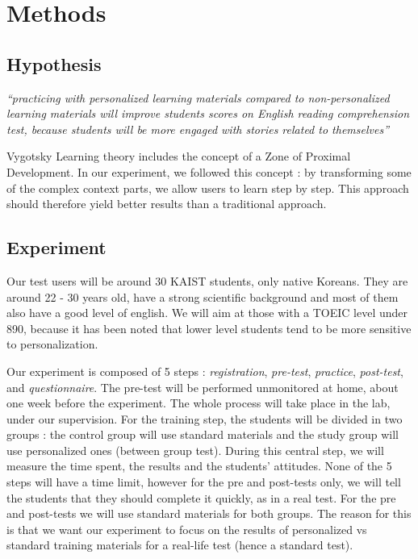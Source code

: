 \documentclass[a4paper,12pt]{article}
\begin{document}
\section{Methods}

\subsection{Hypothesis}

\textit{``practicing with personalized learning materials compared to non-personalized learning materials will improve students scores on English reading comprehension test, because students will be more engaged with stories related to themselves''}

Vygotsky Learning theory includes the concept of a Zone of Proximal Development. In our experiment, we followed this concept : by transforming some of the complex context parts, we allow users to learn step by step. This approach should therefore yield better results than a traditional approach.

\subsection{Experiment}

Our test users will be around 30 KAIST students, only native Koreans. They are around 22 - 30 years old, have a strong scientific background and most of them also have a good level of english. We will aim at those with a TOEIC level under 890, because it has been noted that lower level students tend to be more sensitive to personalization.

Our experiment is composed of 5 steps : \textit{registration}, \textit{pre-test}, \textit{practice}, \textit{post-test}, and \textit{questionnaire}. The pre-test will be performed unmonitored at home, about one week before the experiment. The whole process will take place in the lab, under our supervision. For the training step, the students will be divided in two groups : the control group will use standard materials and the study group will use personalized ones (between group test). During this central step, we will measure the time spent, the results and the students' attitudes. None of the 5 steps will have a time limit, however for the pre and post-tests only, we will tell the students that they should complete it quickly, as in a real test. For the pre and post-tests we will use standard materials for both groups. The reason for this is that we want our experiment to focus on the results of personalized vs standard training materials for a real-life test (hence a standard test).
\end{document}
